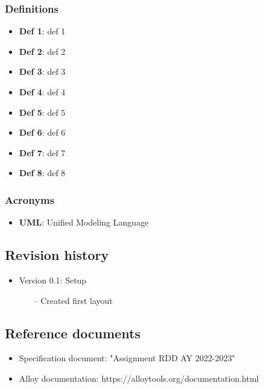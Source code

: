 \documentclass[table, 12pt]{article} %
\begin{document}
    \subsubsection*{Definitions}
        \begin{itemize}
            \item \textbf{Def 1}: def 1 
            \item \textbf{Def 2}: def 2
            \item \textbf{Def 3}: def 3
            \item \textbf{Def 4}: def 4
            \item \textbf{Def 5}: def 5
            \item \textbf{Def 6}: def 6
            \item \textbf{Def 7}: def 7
            \item \textbf{Def 8}: def 8  
        \end{itemize}

    \subsubsection*{Acronyms}
        \begin{itemize}
            \item \textbf{UML}: Unified Modeling Language
        \end{itemize}

    \subsection{Revision history}
        \begin{itemize}
            \item Version 0.1: Setup
            \begin{itemize}
                \item[--] Created first layout
            \end{itemize}
        \end{itemize}

    \subsection{Reference documents}
        \begin{itemize}
            \item Specification document: "Assignment RDD AY 2022-2023"
            \item Alloy documentation: https://alloytools.org/documentation.html
        \end{itemize}
    
\end{document}
